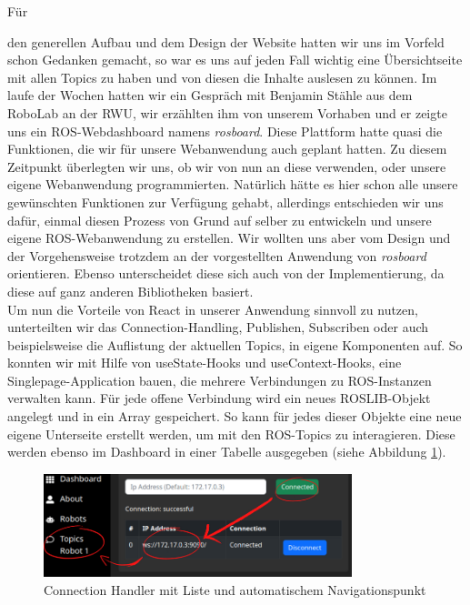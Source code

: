 \begin{flushleft}
\hypertarget{rosboard-target}{Für} den generellen Aufbau und dem Design der Website hatten wir uns im Vorfeld schon Gedanken gemacht, so war es uns auf jeden Fall wichtig eine Übersichtseite mit allen Topics zu haben und von diesen die Inhalte auslesen zu können.
Im laufe der Wochen hatten wir ein Gespräch mit Benjamin Stähle aus dem RoboLab an der RWU, wir erzählten ihm von unserem Vorhaben und er zeigte uns ein ROS-Webdashboard namens \textit{rosboard}.
Diese Plattform hatte quasi die Funktionen, die wir für unsere Webanwendung auch geplant hatten.
Zu diesem Zeitpunkt überlegten wir uns, ob wir von nun an diese verwenden, oder unsere eigene Webanwendung programmierten.
Natürlich hätte es hier schon alle unsere gewünschten Funktionen zur Verfügung gehabt, allerdings entschieden wir uns dafür, einmal diesen Prozess von Grund auf selber zu entwickeln und unsere eigene ROS-Webanwendung zu erstellen.
Wir wollten uns aber vom Design und der Vorgehensweise trotzdem an der vorgestellten Anwendung von \textit{rosboard} orientieren.
Ebenso unterscheidet diese sich auch von der Implementierung, da diese auf ganz anderen Bibliotheken basiert.
\\

\vspace{0.5cm}
Um nun die Vorteile von React in unserer Anwendung sinnvoll zu nutzen, unterteilten wir das Connection-Handling, Publishen, Subscriben oder auch beispielsweise die Auflistung der aktuellen Topics, in eigene Komponenten auf.
So konnten wir mit Hilfe von useState-Hooks und useContext-Hooks, eine Singlepage-Application bauen, die mehrere Verbindungen zu ROS-Instanzen verwalten kann.
Für jede offene Verbindung wird ein neues ROSLIB-Objekt angelegt und in ein Array gespeichert.
So kann für jedes dieser Objekte eine neue eigene Unterseite erstellt werden, um mit den ROS-Topics zu interagieren. Diese werden ebenso im Dashboard in einer Tabelle ausgegeben (siehe Abbildung \ref{fig:ros_conn}).

\begin{figure}[h!]
    \centering
    \includegraphics[width=0.8\textwidth]{imgs/web/ros_conn.png}
    \caption{Connection Handler mit Liste und automatischem Navigationspunkt}
    \label{fig:ros_conn}%
\end{figure}


\end{flushleft}
